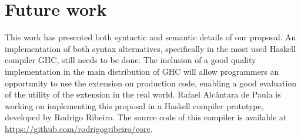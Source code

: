 \documentclass[msc]{ppgccufmg}
\begin{document}
\section{Future work}
This work has presented both syntactic and semantic details of our
proposal. An implementation of both syntax alternatives, specifically in
the most used Haskell compiler GHC, still needs to be done. The
inclusion of a good quality implementation in the main distribution of
GHC will allow programmers an opportunity to use the extension on
production code, enabling a good evaluation of the utility of the
extension in the real world.  Rafael Alcântara de Paula is working on
implementing this proposal in
a Haskell compiler prototype, developed by Rodrigo Ribeiro. The source
code of this compiler is available at
\url{https://github.com/rodrigogribeiro/core}.

\end{document}
